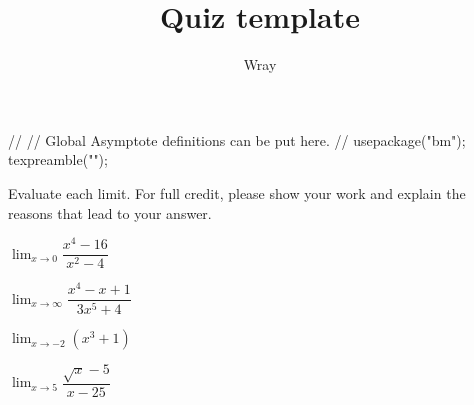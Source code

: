\documentclass[addpoints, 12pt]{exam}
\title{Quiz template}
\author{Wray}
\begin{document}
\begin{asydef}
//
// Global Asymptote definitions can be put here.
//
usepackage("bm");
texpreamble("\def\V#1{\bm{#1}}");
\end{asydef}



\bigskip

             
\bigskip
\bigskip

\smallskip
Evaluate each limit.  For full credit, please show your work and explain the reasons that lead to your answer.
\begin{questions}

\question[5]
$\displaystyle \lim_{x \to 0} \dfrac{x^4 - 16}{x^2 - 4}$

\question[5]
$\displaystyle \lim_{x \to \infty} \dfrac{x^4 - x + 1}{3x^5 + 4}$

\clearpage

\question[5]
$\displaystyle \lim_{x \to -2} \left( x^3 + 1 \right)$

\question[5]
$\displaystyle \lim_{x \to 5} \dfrac{\sqrt{x} - 5}{x - 25}$


\end{questions}
\end{document}
